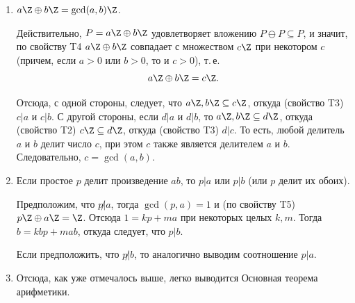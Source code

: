 {\begin{enumerate}[T1]
Далее, если $P\setminus a\Z$ не пусто, то существует $x\in P\setminus a\Z$, причем $x=ka+d$, где $0<d<a$ (то есть $x$ не кратен $a$). Тогда $d=x-ka\in P\ominus P$, т.\,е. $d\in P$, что противоречит выбору $a$ как минимального положительного элемента $P$. Следовательно, $P\subseteq a\Z$, что вместе с предыдущим вложением дает $P=a\Z$.

Таким образом, если $P\ominus P\subseteq P$, то либо $P=\emptyset$, либо $P=a\Z$ при некотором целом $a$ (в том числе. при $a=0$ имеем $P=\{0\}$).

\item $a\Z\oplus b\Z=\gcd(a,b)\Z$.

Действительно, $P=a\Z\oplus b\Z$ удовлетворяет вложению $P\ominus P\subseteq P$, и значит, по свойству T4 $a\Z\oplus b\Z$ совпадает с множеством $c\Z$ при некотором $c$ (причем, если $a>0$ или $b>0$, то и $c>0$), т.\,е.
$$
a\Z\oplus b\Z=c\Z.
$$

Отсюда, с одной стороны, следует, что $a\Z,b\Z\subseteq c\Z$, откуда (свойство T3) $c|a$ и $c|b$. С другой стороны, если $d|a$ и $d|b$, то $a\Z,b\Z\subseteq d\Z$, откуда (свойство T2) $c\Z\subseteq d\Z$, откуда (свойство T3) $d|c$. То есть, любой делитель $a$ и $b$ делит число $c$, при этом $c$ также является делителем $a$ и $b$. Следовательно, $c=\gcd(a,b)$.

\item Если простое $p$ делит произведение $ab$, то $p|a$ или $p|b$ (или $p$ делит их обоих).

Предположим, что $p\not|a$, тогда $\gcd(p,a)=1$ и (по свойству T5) $p\Z\oplus a\Z=\Z$. Отсюда $1=kp+ma$ при некоторых целых $k,m$. Тогда $b=kbp+mab$, откуда следует, что $p|b$.

Если предположить, что $p\not|b$, то аналогично выводим соотношение $p|a$.
\item Отсюда, как уже отмечалось выше, легко выводится Основная теорема арифметики.
\end{enumerate}

}

